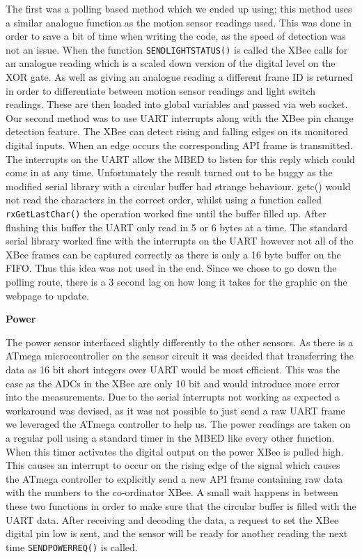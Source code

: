 \documentclass[10.5pt,a4paper,twoside]{report}   %
\begin{document}
The first was a polling based method which we ended up using; this method uses a similar analogue function as the motion sensor readings used. This was done in order to save a bit of time when writing the code, as the speed of detection was not an issue. When the function \verb+SENDLIGHTSTATUS()+ is called the XBee calls for an analogue reading which is a scaled down version of the digital level on the XOR gate. As well as giving an analogue reading a different frame ID is returned in order to differentiate between motion sensor readings and light switch readings. These are then loaded into global variables and passed via web socket.
Our second method was to use UART interrupts along with the XBee pin change detection feature. The XBee can detect rising and falling edges on its monitored digital inputs. When an edge occurs the corresponding API frame is transmitted. The interrupts on the UART allow the MBED to listen for this reply which could come in at any time. Unfortunately the result turned out to be buggy as the modified serial library with a circular buffer had strange behaviour. getc() would not read the characters in the correct order, whilst using a function called \verb+rxGetLastChar()+ the operation worked fine until the buffer filled up. After flushing this buffer the UART only read in 5 or 6 bytes at a time.
The standard serial library worked fine with the interrupts on the UART however not all of the XBee frames can be captured correctly as there is only a 16 byte buffer on the FIFO. Thus this idea was not used in the end. Since we chose to go down the polling route, there is a 3 second lag on how long it takes for the graphic on the webpage to update.

\textbf{Power}

The power sensor interfaced slightly differently to the other sensors. As there is a ATmega microcontroller on the sensor circuit it was decided that transferring the data as 16 bit short integers over UART would be most efficient. This was the case as the ADCs in the XBee are only 10 bit and would introduce more error into the measurements. Due to the serial interrupts not working as expected a workaround was devised, as it was not possible to just send a raw UART frame we leveraged the ATmega controller to help us. The power readings are taken on a regular poll using a standard timer in the MBED like every other function. When this timer activates the digital output on the power XBee is pulled high. This  causes an interrupt to occur on the rising edge of the signal which causes the ATmega controller to explicitly send a new API frame containing raw data with the numbers to the co-ordinator XBee. A small wait happens in between these two functions in order to make sure that the circular buffer is filled with the UART data. After receiving and decoding the data, a request to set the XBee digital pin low is sent, and the sensor will be ready for another reading the next time \verb+SENDPOWERREQ()+ is called.
\end{document}
